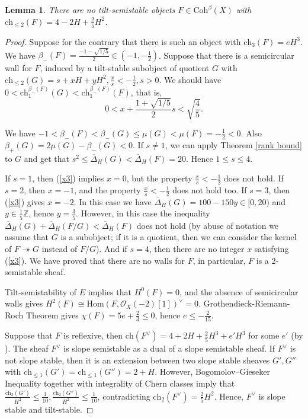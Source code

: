\documentclass{amsart}
\newtheorem{lemma}[theorem]{Lemma}
\begin{document}
	\begin{lemma}\label{4 -2 2/5} There are no tilt-semistable objects $F\in\mathrm{Coh}^\beta(X)$ with $\mathrm{ch}_{\le 2}(F)=4-2H+\frac 25H^2$.
	\end{lemma}
	
	\begin{proof}Suppose for the contrary that there is such an object with $\mathrm{ch}_3(F)=eH^3$. We have $\beta_-(F)=\frac{-1-\sqrt{1/5}}{2}\in(-1,-\frac 12)$. Suppose that there is a semicircular wall for $F$, induced by a tilt-stable subobject of quotient $G$ with $\mathrm{ch}_{\le 2}(G)=s+xH+yH^2,\frac xs<-\frac 12,s>0$. We should have $0<\mathrm{ch}_1^{\beta_-(F)}(G)<\mathrm{ch}_1^{\beta_-(F)}(F)$, that is,
		\begin{equation}\label{x3}0<x+\frac{1+\sqrt{1/5}}{2}s<\sqrt{\frac 45}.
		\end{equation}
		
		We have $-1<\beta_-(F)<\beta_-(G)\le\mu(G)<\mu(F)=-\frac 12<0$. Also $\beta_+(G)=2\mu(G)-\beta_-(G)<0$. If $s\neq 1$, we can apply Theorem \ref{rank bound} to $G$ and get that $s^2\le\overline{\Delta}_H(G)<\overline{\Delta}_H(F)=20$. Hence $1\le s\le 4$.
		
		If $s=1$, then (\ref{x3}) implies $x=0$, but the property $\frac xs<-\frac 12$ does not hold. If $s=2$, then $x=-1$, and the property $\frac xs<-\frac 12$ does not hold too. If $s=3$, then (\ref{x3}) gives $x=-2$. In this case we have $\overline{\Delta}_H(G)=100-150y\in[0,20)$ and $y\in\frac 15\mathbb Z$, hence $y=\frac 35$. However, in this case the inequality $\overline{\Delta}_H(G)+\overline{\Delta}_H(F/G)<\overline{\Delta}_H(F)$ does not hold (by abuse of notation we assume that $G$ is a subobject; if it is a quotient, then we can consider the kernel of $F\twoheadrightarrow G$ instead of $F/G$). And if $s=4$, then there are no integer $x$ satisfying (\ref{x3}). We have proved that there are no walls for $F$, in particular, $F$ is a 2-semistable sheaf.
		
		Tilt-semistability of $E$ implies that $H^0(F)=0$, and the absence of semicircular walls gives $H^2(F)\cong\mathrm{Hom}(F,\mathcal O_X(-2)[1])^\vee=0$. Grothendieck-Riemann-Roch Theorem gives $\chi(F)=5e+\frac 23\le 0$, hence $e\le-\frac{2}{15}$. 
		
		Suppose that $F$ is reflexive, then $\mathrm{ch}(F^\vee)=4+2H+\frac 25H^3+e'H^3$ for some $e'$ (by \cite[Lemma 2.17]{Vass}). The sheaf $F^\vee$ is slope semistable as a dual of a slope semistable sheaf. If $F^\vee$ is not slope stable, then it is an extension between two slope stable sheaves $G',G''$ with $\mathrm{ch}_{\le 1}(G')=\mathrm{ch}_{\le 1}(G'')=2+H$. However, Bogomolov--Gieseker Inequality together with integrality of Chern classes imply that $\frac{\mathrm{ch}_2(G')}{H^2}\le\frac{1}{10},\frac{\mathrm{ch}_2(G'')}{H^2}\le\frac{1}{10}$, contradicting $\mathrm{ch}_2(F^\vee)=\frac 25H^2$. Hence, $F^\vee$ is slope stable and tilt-stable.
		

\end{proof}
\end{document}
